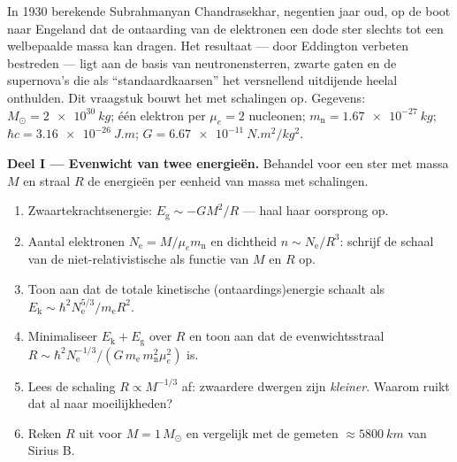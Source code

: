 \begin{problem}\label{pb:b3:quantum-statistics:1}
In 1930 berekende Subrahmanyan Chandrasekhar, negentien jaar oud, op de
boot naar Engeland dat de ontaarding van de elektronen een dode ster
slechts tot een welbepaalde massa kan dragen. Het resultaat --- door
Eddington verbeten bestreden --- ligt aan de basis van neutronensterren,
zwarte gaten en de supernova's die als ``standaardkaarsen'' het versnellend
uitdijende heelal onthulden. Dit vraagstuk bouwt het met schalingen op.
Gegevens: $M_\odot =
\qty{2e30}{kg}$; één elektron per $\mu_e = 2$
nucleonen; $m_{\text{n}} = \qty{1.67e-27}{kg}$; $\hbar c = \qty{3.16e-26}{J.m}$; $G =
\qty{6.67e-11}{N.m^2/kg^2}$.

\medskip\noindent\textbf{Deel I --- Evenwicht van twee energieën.}
Behandel voor een ster met massa $M$ en straal $R$ de energieën per
eenheid van massa met schalingen.
\begin{enumerate}
  \item Zwaartekrachtsenergie: $E_{\text{g}} \sim -GM^2/R$ --- haal haar
        oorsprong op.
  \item Aantal elektronen $N_{\text{e}} = M/\mu_e m_{\text{n}}$ en
        dichtheid $n \sim N_{\text{e}}/R^3$: schrijf de schaal van de
        niet-relativistische  als functie van $M$ en $R$ op.
  \item Toon aan dat de totale kinetische (ontaardings)energie schaalt als
        $E_{\text{k}} \sim \hbar^2N_{\text{e}}^{5/3}/m_{\text{e}}
        R^2$.
  \item Minimaliseer $E_{\text{k}} + E_{\text{g}}$ over $R$ en toon aan
        dat de evenwichtsstraal $R \sim \hbar^2 N_{\text{e}}^{-1/3}/(G\,m_{\text{e}}\,
        m_{\text{n}}^2\mu_e^2)$ is.
  \item Lees de schaling $R \propto M^{-1/3}$ af: zwaardere dwergen zijn
        \emph{kleiner}. Waarom ruikt dat al naar moeilijkheden?
  \item Reken $R$ uit voor $M = 1\,M_\odot$ en vergelijk met de gemeten
        $\approx\qty{5800}{km}$ van Sirius B.
\end{enumerate}


\end{problem}
